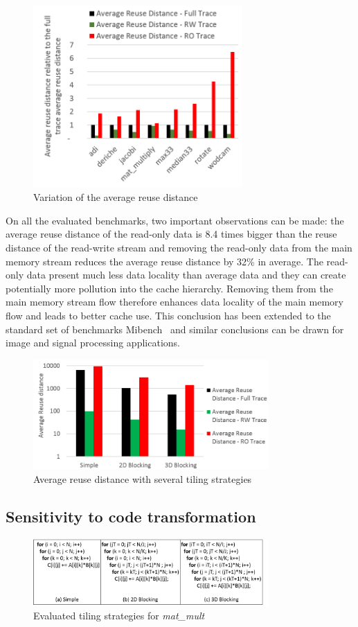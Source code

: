 \documentclass[sigconf]{acmart}
\begin{document}
\begin{figure}
    \centering
    \includegraphics[width=8cm]{./images/stackdistance.png}
     \caption{Variation of the average reuse distance}
    \label{stackdistance}
\end{figure}

On all the evaluated benchmarks, two important observations can be made: the average reuse distance of the read-only data is 8.4 times bigger than the reuse distance of the read-write stream and removing the read-only data from the main memory stream reduces the average reuse distance by 32\% in average. The read-only data present much less data locality than average data and they can create potentially more pollution into the cache hierarchy. Removing them from the main memory stream flow therefore enhances data locality of the main memory flow and leads to better cache use. This conclusion has been extended to the standard set of benchmarks Mibench~\cite{vaumourin:2014} and similar conclusions can be drawn for image and signal processing applications. 


\begin{figure}
    \centering
    \includegraphics[width=9cm]{./images/blocking1.png}
     \caption{Average reuse distance with several tiling strategies}
    \label{blocking}
\end{figure}

\subsection{Sensitivity to code transformation}
\begin{figure}
    \centering
    \includegraphics[width=9cm]{./images/matmul.png}
     \caption{Evaluated tiling strategies for \textit{mat\_mult}}
    \label{matmul}
\end{figure}
\end{document}

